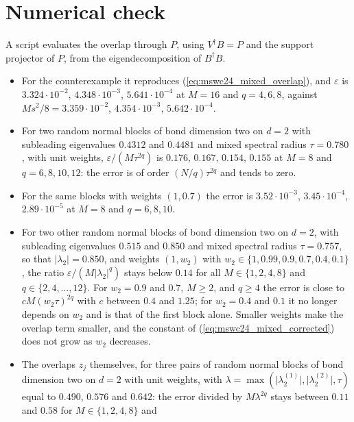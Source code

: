 \documentclass{article}
\begin{document}
\section{Numerical check}
A script evaluates the overlap through $P$, using $V^\dagger B=P$ and the support
projector of $P$, from the eigendecomposition of $B^\dagger B$.
\begin{itemize}
    \item For the counterexample it reproduces (\ref{eq:mswc24_mixed_overlap}), and
          $\varepsilon$ is $3.324\cdot10^{-2}$, $4.348\cdot10^{-3}$, $5.641\cdot10^{-4}$ at
          $M=16$ and $q=4,6,8$, against $Ms^2/8=3.359\cdot10^{-2}$, $4.354\cdot10^{-3}$,
          $5.642\cdot10^{-4}$.
    \item For two random normal blocks of bond dimension two on $d=2$ with subleading
          eigenvalues $0.4312$ and $0.4481$ and mixed spectral radius $\tau=0.780$, with
          unit weights, $\varepsilon/(M\tau^{2q})$ is $0.176$, $0.167$, $0.154$, $0.155$ at
          $M=8$ and $q=6,8,10,12$: the error is of order $(N/q)\tau^{2q}$ and tends to
          zero.
    \item For the same blocks with weights $(1,0.7)$ the error is $3.52\cdot10^{-3}$,
          $3.45\cdot10^{-4}$, $2.89\cdot10^{-5}$ at $M=8$ and $q=6,8,10$.
    \item For two other random normal blocks of bond dimension two on $d=2$, with subleading
          eigenvalues $0.515$ and $0.850$ and mixed spectral radius $\tau=0.757$, so that
          $\lvert\lambda_2\rvert=0.850$, and weights $(1,w_2)$ with
          $w_2\in\{1,0.99,0.9,0.7,0.4,0.1\}$, the ratio $\varepsilon/(M\lvert\lambda_2\rvert^q)$
          stays below $0.14$ for all $M\in\{1,2,4,8\}$ and $q\in\{2,4,\dots,12\}$. For
          $w_2=0.9$ and $0.7$, $M\geq2$, and $q\geq4$ the error is close to $cM(w_2\tau)^{2q}$
          with $c$ between $0.4$ and $1.25$; for $w_2=0.4$ and $0.1$ it no longer depends on $w_2$ and is
          that of the first block alone. Smaller weights make the overlap term smaller, and the
          constant of (\ref{eq:mswc24_mixed_corrected}) does not grow as $w_2$ decreases.
    \item The overlaps $z_j$ themselves, for three pairs of random normal blocks of bond
          dimension two on $d=2$ with unit weights, with $\lambda=\max(\lvert\lambda_2^{(1)}\rvert,
              \lvert\lambda_2^{(2)}\rvert,\tau)$ equal to $0.490$, $0.576$ and $0.642$: the error divided
          by $M\lambda^{2q}$ stays between $0.11$ and $0.58$ for $M\in\{1,2,4,8\}$ and

\end{itemize}
\end{document}
